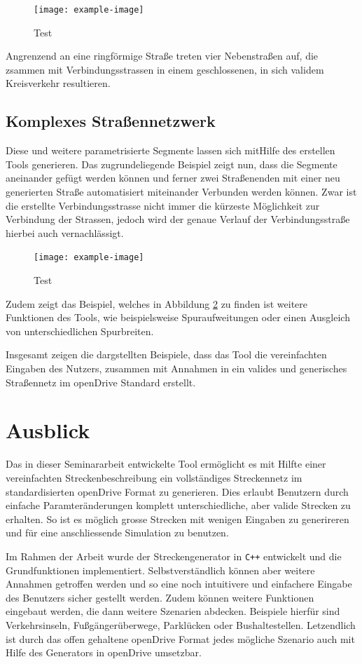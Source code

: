 \begin{figure}[h]
	\flushleft
	\texttt{[image: example-image]}
	\caption{Test \cite{Donges.1982,Werling.2017}}
	\label{abb6}
\end{figure}

Angrenzend an eine ringförmige Straße treten vier Nebenstraßen auf, die zsammen  mit Verbindungsstrassen in einem geschlossenen, in sich validem Kreisverkehr resultieren.   

\section{Komplexes Straßennetzwerk}

Diese und weitere parametrisierte Segmente lassen sich mitHilfe des erstellen Tools generieren. Das zugrundeliegende Beispiel zeigt nun, dass die Segmente aneinander gefügt werden können und ferner zwei Straßenenden mit einer neu generierten Straße automatisiert miteinander Verbunden werden können. Zwar ist die erstellte Verbindungsstrasse nicht immer die kürzeste Möglichkeit zur Verbindung der Strassen, jedoch wird der genaue Verlauf der Verbindungsstraße hierbei auch vernachlässigt.

\begin{figure}[h]
	\flushleft
	\texttt{[image: example-image]}
	\caption{Test \cite{Donges.1982,Werling.2017}}
	\label{abb7}
\end{figure}

Zudem zeigt das Beispiel, welches in Abbildung  \ref{abb7} zu finden ist weitere Funktionen des Tools, wie beispielsweise Spuraufweitungen oder einen Ausgleich von unterschiedlichen Spurbreiten.

Insgesamt zeigen die dargstellten Beispiele, dass das Tool die vereinfachten Eingaben des Nutzers, zusammen mit Annahmen in ein valides und generisches Straßennetz im openDrive Standard erstellt.

\chapter{Ausblick}

Das in dieser Seminararbeit entwickelte Tool ermöglicht es mit Hilfte einer vereinfachten Streckenbeschreibung ein vollständiges Streckennetz im standardisierten openDrive Format zu generieren. Dies erlaubt Benutzern durch einfache Paramteränderungen komplett unterschiedliche, aber valide Strecken zu erhalten. So ist es möglich grosse Strecken mit wenigen Eingaben zu generireren und für eine anschliessende Simulation zu benutzen.

Im Rahmen der Arbeit wurde der Streckengenerator in \texttt{C++} entwickelt und die Grundfunktionen implementiert. Selbstverständlich können aber weitere Annahmen getroffen werden und so eine noch intuitivere und einfachere Eingabe des Benutzers sicher gestellt werden. Zudem können weitere Funktionen eingebaut werden, die dann weitere Szenarien abdecken. Beispiele hierfür sind Verkehrsinseln, Fußgängerüberwege, Parklücken oder Bushaltestellen. Letzendlich ist durch das offen gehaltene openDrive Format jedes mögliche Szenario auch mit Hilfe des Generators in openDrive umsetzbar.

